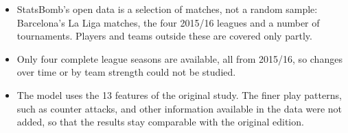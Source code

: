 \begin{itemize}
    \item StatsBomb's open data is a selection of matches, not a random sample: Barcelona's La Liga matches, the four 2015/16 leagues and a number of tournaments. Players and teams outside these are covered only partly.
    \item Only four complete league seasons are available, all from 2015/16, so changes over time or by team strength could not be studied.
    \item The model uses the 13 features of the original study. The finer play patterns, such as counter attacks, and other information available in the data were not added, so that the results stay comparable with the original edition.
\end{itemize}
